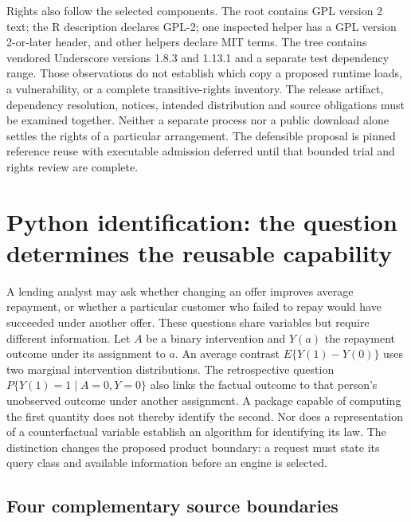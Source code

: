 Rights also follow the selected components. The root contains GPL version 2
text; the R description declares GPL-2; one inspected helper has a
GPL version 2-or-later header, and other helpers declare MIT terms. The tree
contains vendored Underscore versions 1.8.3 and 1.13.1 and a separate test
dependency range. Those observations do not establish which copy a proposed
runtime loads, a vulnerability, or a complete transitive-rights inventory.
The release artifact, dependency resolution, notices, intended distribution
and source obligations must be examined together. Neither a separate process
nor a public download alone settles the rights of a particular arrangement.
The defensible proposal is pinned reference reuse with executable admission
deferred until that bounded trial and rights review are complete.
\citep{exec18_gp_dagitty}


\section{Python identification: the question determines the reusable capability}
\label{exec18:pyid-question}

A lending analyst may ask whether changing an offer improves average repayment,
or whether a particular customer who failed to repay would have succeeded under
another offer. These questions share variables but require different information.
Let $A$ be a binary intervention and $Y(a)$ the repayment outcome under its
assignment to $a$. An average contrast $E\{Y(1)-Y(0)\}$ uses two marginal
intervention distributions. The retrospective question
$P\{Y(1)=1\mid A=0,Y=0\}$ also links the factual outcome to that person's
unobserved outcome under another assignment. A package capable of computing the
first quantity does not thereby identify the second. Nor does a representation
of a counterfactual variable establish an algorithm for identifying its law.
The distinction changes the proposed product boundary: a request must state its
query class and available information before an engine is selected.
\citep{exec13_y0_dsl,exec18_pyid_contract}

\subsection{Four complementary source boundaries}
\label{exec18:pyid-packages}

